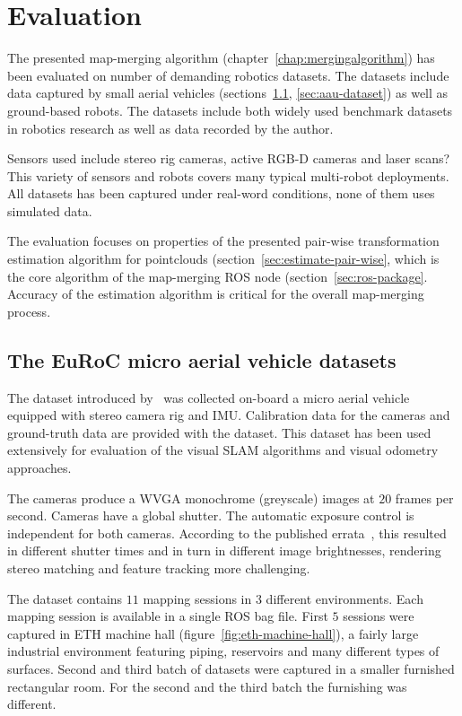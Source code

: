 \chapter{Evaluation}
\label{chap:evaluation}

The presented map-merging algorithm (chapter~\ref{chap:mergingalgorithm}) has been evaluated on number of demanding robotics datasets. The datasets include data captured by small aerial vehicles (sections~\ref{sec:euroc-dataset}, \ref{sec:aau-dataset}) as well as ground-based robots. The datasets include both widely used benchmark datasets in robotics research as well as data recorded by the author.

Sensors used include stereo rig cameras, active \gls{RGB-D} cameras and laser scans? This variety of sensors and robots covers many typical multi-robot deployments. All datasets has been captured under real-word conditions, none of them uses simulated data.

The evaluation focuses on properties of the presented pair-wise transformation estimation algorithm for pointclouds (section~\ref{sec:estimate-pair-wise}, which is the core algorithm of the map-merging \gls{ROS} node (section~\ref{sec:ros-package}. Accuracy of the estimation algorithm is critical for the overall map-merging process.

\section{The EuRoC micro aerial vehicle datasets}
\label{sec:euroc-dataset}

The dataset introduced by~\citet{Burri2016} was collected on-board a micro aerial vehicle equipped with stereo camera rig and \gls{IMU}. Calibration data for the cameras and ground-truth data are provided with the dataset. This dataset has been used extensively for evaluation of the visual \gls{SLAM} algorithms and visual odometry approaches.

The cameras produce a WVGA monochrome (greyscale) images at $20$ frames per second. Cameras have a global shutter. The automatic exposure control is independent for both cameras. According to the published errata~\citep{Burri2016}, this resulted in different shutter times and in turn in different image brightnesses, rendering stereo matching and feature tracking more challenging.

The dataset contains $11$ mapping sessions in $3$ different environments. Each mapping session is available in a single \gls{ROS} bag file. First $5$ sessions were captured in ETH machine hall (figure~\ref{fig:eth-machine-hall}), a fairly large industrial environment featuring piping, reservoirs and many different types of surfaces. Second and third batch of datasets were captured in a smaller furnished rectangular room. For the second and the third batch the furnishing was different.

